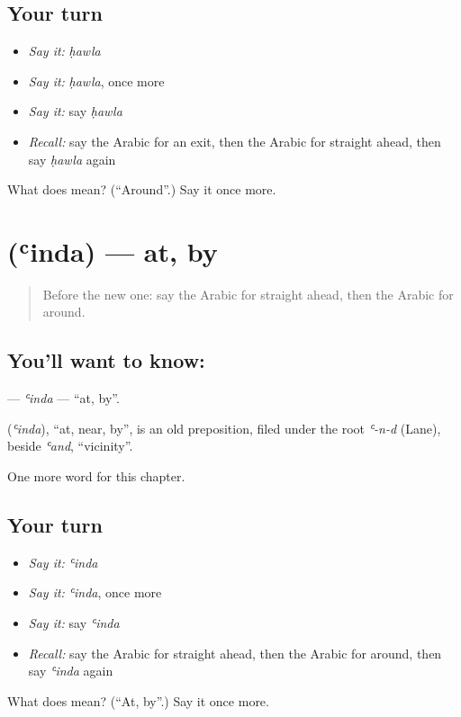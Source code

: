 \subsection*{Your turn}
\begin{itemize}
\raggedright
  \item \emph{Say it:} \emph{ḥawla}
  \item \emph{Say it:} \emph{ḥawla}, once more
  \item \emph{Say it:} say \emph{ḥawla}
  \item \emph{Recall:} say the Arabic for an exit, then the Arabic for straight ahead, then say \emph{ḥawla} again
\end{itemize}

\begin{tcolorbox}[breakable,colback=teal!4,colframe=teal!35!black,title={Before you move on}]
What does  mean? (\textquotedblleft{}Around\textquotedblright{}.) Say it once more.
\end{tcolorbox}
\section[\texorpdfstring{\ar{عند} (ʿinda)}{عند (ʿinda)}]{ (ʿinda) — at, by}

\label{lesson:AR-C105-inda}



\begin{quote}
Before the new one: say the Arabic for straight ahead, then the Arabic for around.
\end{quote}

\subsection*{You'll want to know: }
\textbf{} — \emph{ʿinda} — \textquotedblleft{}at, by\textquotedblright{}.

\begin{cousinweb}
\textbf{} (\emph{ʿinda}), \textquotedblleft{}at, near, by\textquotedblright{}, is an old preposition, filed under the root \emph{ʿ-n-d} (Lane), beside \emph{ʿand}, \textquotedblleft{}vicinity\textquotedblright{}.
\end{cousinweb}

\begin{grammarlens}[title={What you've built}]
One more word for this chapter.
\end{grammarlens}

\subsection*{Your turn}
\begin{itemize}
\raggedright
  \item \emph{Say it:} \emph{ʿinda}
  \item \emph{Say it:} \emph{ʿinda}, once more
  \item \emph{Say it:} say \emph{ʿinda}
  \item \emph{Recall:} say the Arabic for straight ahead, then the Arabic for around, then say \emph{ʿinda} again
\end{itemize}

\begin{tcolorbox}[breakable,colback=teal!4,colframe=teal!35!black,title={Before you move on}]
What does  mean? (\textquotedblleft{}At, by\textquotedblright{}.) Say it once more.
\end{tcolorbox}
